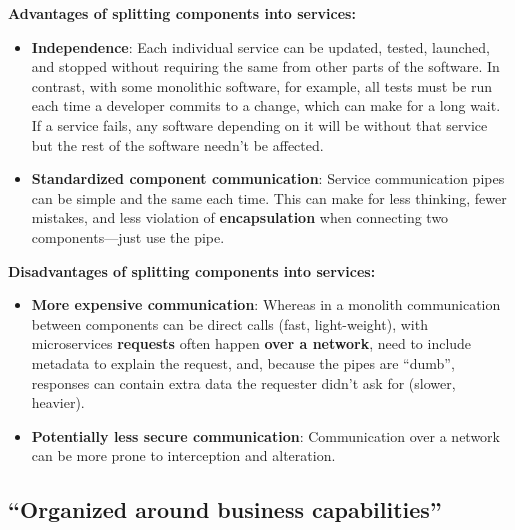 \spacer
\noindent\textbf{Advantages of splitting components into services:}\\

\begin{itemize}
    \item \textbf{Independence}: Each individual service can be updated, tested, launched, and stopped without requiring the same from other parts of the software. In contrast, with some monolithic software, for example, all tests must be run each time a developer commits to a change, which can make for a long wait. If a service fails, any software depending on it will be without that service but the rest of the software needn't be affected.\\
    \item \textbf{Standardized component communication}: Service communication pipes can be simple and the same each time. This can make for less thinking, fewer mistakes, and less violation of \textbf{encapsulation} when connecting two components---just use the pipe.
\end{itemize}

\spacer
\noindent\textbf{Disadvantages of splitting components into services:}\\

\begin{itemize}
    \item \textbf{More expensive communication}: Whereas in a monolith communication between components can be direct calls (fast, light-weight), with microservices \textbf{requests} often happen \textbf{over a network}, need to include metadata to explain the request, and, because the pipes are ``dumb'', responses can contain extra data the requester didn't ask for (slower, heavier).\\
    \item \textbf{Potentially less secure communication}: Communication over a network can be more prone to interception and alteration.
\end{itemize}

\subsection{``Organized around business capabilities''}\marginpar{\clientServerArchitectureDef\margindivider}\marginpar{\businessCapabilityDef\margindivider}\marginpar{\eventualConsistencyDef\margindivider}\marginpar{\techStackDef}

